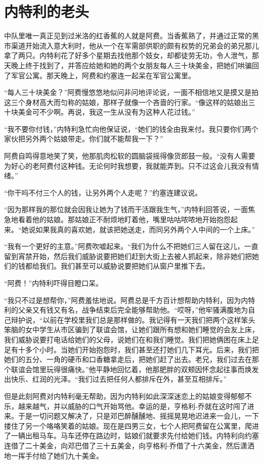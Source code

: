\chapter{内特利的老头}
 
    中队里唯一真正见到过米洛的红香蕉的人就是阿费。当香蕉熟了，并通过正常的黑市渠道开始流入意大利时，他从一个在军需部供职的颇有权势的兄弟会的弟兄那儿拿了两只。内特利花了好多个星期去找他那个妓女，却都徒劳无功，令人泄气，那天晚上终于找到了，并答应给她和她的两个女朋友每人三十块美金，把她们哄骗回了军官公寓。那天晚上，阿费和约塞连一起呆在军官公寓里。

    “每人三十块美金？”阿费慢悠悠地似问非问地评论说，一面不相信地又是摸又是拍这三个身材高大而匀称的姑娘，那样子就像一个吝啬的行家。“像这样的姑娘出三十块美金可不少啊。再说，我这一生从没有为这种人花过钱。”

    “我不要你付钱，”内特利急忙向他保证说，“她们的钱全由我来付。我只要你们两个家伙把另外两个姑娘带走。你们就不能帮我一下？”

    阿费自鸣得意地笑了笑，他那肌肉松软的圆脑袋摇得像货郎鼓一般。“没有人需要为好心的老阿费付这种钱。无论何时我想要，我就能弄到。只不过这会儿我没有情绪。”

    “你干吗不付三个人的钱，让另外两个人走呢？”约塞连建议说。

    “因为那样我的那位就会因我让她为了钱而干活跟我生气，”内特利回答说，一面焦急地看着他的姑娘。那姑娘正不耐烦地盯着他，嘴里咕咕哝哝地开始抱怨起来。“她说如果我真的喜欢她，就该把她送走，而同另外两个人中间的一个上床。”

    “我有一个更好的主意。”阿费吹嘘起来。“我们为什么不把她们三人留在这儿，一直留到宵禁开始，然后我们威胁说要把她们赶到大街上去被人抓起来，除非她们把她们的钱都给我们。我们甚至可以威胁说要把她们从窗户里推下去。

    “阿费！”内特利吓得目瞪口呆。

    “我只不过是想帮你，”阿费羞怯地说。阿费总是千方百计想帮助内特利，因为内特利的父亲又有钱又有名，战争结束后完全能够帮助他。“哎呀，”他牢骚满腹地为自己辩护说，“以前在学校里我们总是那样做的。我记得有一天我们把两个这样笨头笨脑的女中学生从市区骗到了联谊会馆，让她们跟所有想和她们睡觉的会友上床，我们威胁说要打电话给她们的父母，说她们在和我们睡觉。我们把她俩困在床上足足有十多个小时。当她们开始抱怨时，我们甚至还打她们几下耳光。后来，我们把她们的五分、一角的硬币和口香糖拿走后，把她们赶了出去。老兄，我们过去在那个联谊会馆里玩得很痛快。”他平静地回忆着，他那肥胖的双颊因怀念起往事而焕发出快乐、红润的光泽。“我们过去把任何人都排斥在外，甚至互相排斥。”

    但是此刻阿费对内特利毫无帮助，因为内特利如此深深迷恋上的姑娘变得郁郁不乐，越来越气，并以威胁的口气开始骂他。幸运的是，亨格利-乔就在这时闯了进来。于是一切问题又解决了，只是邓巴醉醺醺地、摇摇晃晃地迟进来一会儿，一下搂住了另一个咯咯笑着的姑娘。现在是四男三女，七个人把阿费留在公寓里，爬进了一辆出租马车。马车还停在路边时，姑娘们就要求先付给她们钱。内特利向约塞连借了二十美金，向邓巴借了三十五美金，向亨格利-乔借了十六美金，然后潇洒地一挥手付给了她们九十美金。

